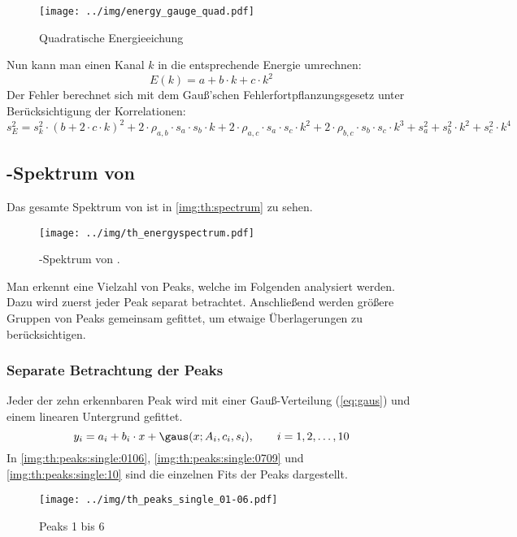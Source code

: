 \begin{figure}[H]
\begin{center}
  \texttt{[image: ../img/energy\_gauge\_quad.pdf]}
  \caption{Quadratische Energieeichung}
  \label{img:gauge:quad}
\end{center}
\end{figure}
Nun kann man einen Kanal $k$ in die entsprechende Energie umrechnen:
\begin{equation}
  \label{eq:energygauge}
  E(k) = a + b \cdot k + c \cdot k^2
\end{equation}
Der Fehler berechnet sich mit dem Gauß'schen Fehlerfortpflanzungsgesetz unter Berücksichtigung der Korrelationen:
\begin{equation}
	\label{eq:energygauge:error}
  s_E^2 = s_{k}^2 \cdot (b + 2 \cdot c \cdot k)^2 + 2 \cdot \rho_{a, b} \cdot s_{a} \cdot s_{b} \cdot k + 2 \cdot \rho_{a, c} \cdot s_{a} \cdot s_{c} \cdot k^2 +
  2 \cdot \rho_{b, c} \cdot s_{b} \cdot s_{c} \cdot k^3 + s_{a}^2 + s_{b}^2 \cdot k^2 + s_{c}^2 \cdot k^4
\end{equation}

\subsection{\textgamma-Spektrum von \th}
Das gesamte Spektrum von \th ist in \autoref{img:th:spectrum} zu sehen.
\begin{figure}[H]
\begin{center}
  \texttt{[image: ../img/th\_energyspectrum.pdf]}
  \caption{\textgamma-Spektrum von \th.}
  \label{img:th:spectrum}
\end{center}
\end{figure}
Man erkennt eine Vielzahl von Peaks, welche im Folgenden analysiert werden. Dazu wird zuerst jeder Peak separat betrachtet. Anschließend werden 
größere Gruppen von Peaks gemeinsam gefittet, um etwaige Überlagerungen zu berücksichtigen.

\subsubsection{Separate Betrachtung der Peaks}
Jeder der zehn erkennbaren Peak wird mit einer Gauß-Verteilung (\autoref{eq:gaus}) und einem linearen Untergrund gefittet.
\begin{equation}
  y_i = a_i + b_i \cdot x + \gaus(x; A_i, c_i, s_i), \qquad i=1, 2, \ldots, 10
\end{equation}
In \autoref{img:th:peaks:single:0106}, \autoref{img:th:peaks:single:0709} und \autoref{img:th:peaks:single:10} sind die einzelnen Fits der Peaks 
dargestellt.
\begin{figure}[H]
\begin{center}
  \texttt{[image: ../img/th\_peaks\_single\_01-06.pdf]}
  \caption{Peaks 1 bis 6}
  \label{img:th:peaks:single:0106}
\end{center}
\end{figure}

